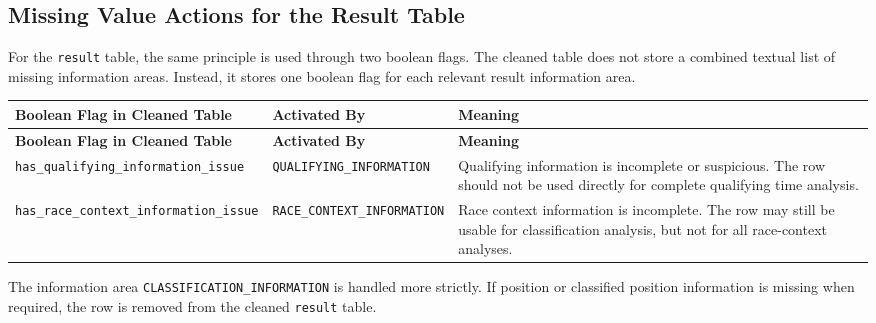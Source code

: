 \documentclass[a4paper,11pt]{article}
\newcommand{\codebreak}[1]{\nolinkurl{#1}}
\begin{document}
	
	\subsection{Missing Value Actions for the Result Table}
	
	For the \texttt{result} table, the same principle is used through two boolean flags.
	The cleaned table does not store a combined textual list of missing information areas.
	Instead, it stores one boolean flag for each relevant result information area.
	
	\begin{longtable}{p{5cm}p{5cm}p{5cm}}
		\toprule
		\textbf{Boolean Flag in Cleaned Table} & \textbf{Activated By} & \textbf{Meaning} \\
		\midrule
		\endfirsthead
		
		\toprule
		\textbf{Boolean Flag in Cleaned Table} & \textbf{Activated By} & \textbf{Meaning} \\
		\midrule
		\endhead
		
		\codebreak{has_qualifying_information_issue}
		& \codebreak{QUALIFYING_INFORMATION}
		& Qualifying information is incomplete or suspicious. The row should not be used directly for complete qualifying time analysis. \\
		\midrule
		
		\codebreak{has_race_context_information_issue}
		& \codebreak{RACE_CONTEXT_INFORMATION}
		& Race context information is incomplete. The row may still be usable for classification analysis, but not for all race-context analyses. \\
		\bottomrule
	\end{longtable}
	
	The information area \texttt{CLASSIFICATION\_INFORMATION} is handled more strictly.
	If position or classified position information is missing when required, the row is removed from the cleaned \texttt{result} table.
	
\end{document}
